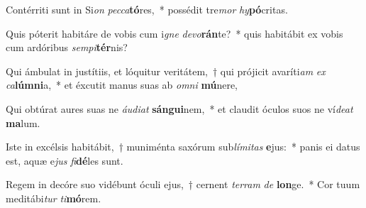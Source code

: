 \item Contérriti sunt in Si\textit{on} \textit{pec}\textit{ca}\textbf{tó}res,~* possédit tre\textit{mor} \textit{hy}\textbf{pó}critas.
\item Quis póterit habitáre de vobis cum i\textit{gne} \textit{de}\textit{vo}\textbf{rán}te?~* quis habitábit ex vobis cum ardóribus \textit{sem}\textit{pi}\textbf{tér}nis?
\item Qui ámbulat in justítiis, et lóquitur veritátem,~† qui prójicit avaríti\textit{am} \textit{ex} \textit{ca}\textbf{lúm}\textbf{ni}a,~* et éxcutit manus suas ab \textit{om}\textit{ni} \textbf{mú}nere,
\item Qui obtúrat aures suas ne \textit{áu}\textit{di}\textit{at} \textbf{sán}\textbf{gui}nem,~* et claudit óculos suos ne ví\textit{de}\textit{at} \textbf{ma}lum.
\item Iste in excélsis habitábit,~† muniménta saxórum sub\textit{lí}\textit{mi}\textit{tas} \textbf{e}jus:~* panis ei datus est, aquæ e\textit{jus} \textit{fi}\textbf{dé}les sunt.
\item Regem in decóre suo vidébunt óculi ejus,~† cernent \textit{ter}\textit{ram} \textit{de} \textbf{lon}ge.~* Cor tuum meditábi\textit{tur} \textit{ti}\textbf{mó}rem.
